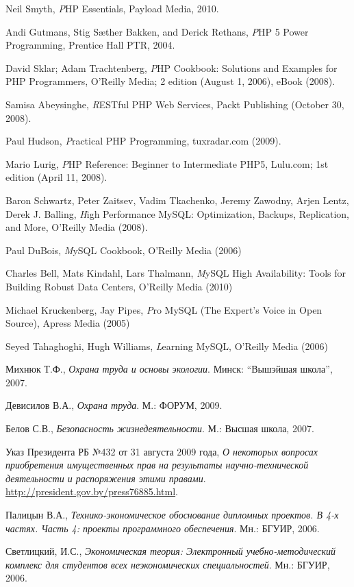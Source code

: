 \begin{thebibliography}{}

\bibitem{}
  Neil Smyth,
  \emph PHP Essentials,
  Payload Media,
  2010.

\bibitem{}
  Andi Gutmans, Stig Sæther Bakken, and Derick Rethans,
  \emph PHP 5 Power Programming,
  Prentice Hall PTR,
  2004.

\bibitem{}
  David Sklar; Adam Trachtenberg,
  \emph PHP Cookbook: Solutions and Examples for PHP Programmers,
  O'Reilly Media; 2 edition (August 1, 2006), eBook (2008).

\bibitem{}
  Samisa Abeysinghe,
  \emph RESTful PHP Web Services,
  Packt Publishing (October 30, 2008).

\bibitem{}
  Paul Hudson,
  \emph Practical PHP Programming,
  tuxradar.com (2009).

\bibitem{}
  Mario Lurig,
  \emph PHP Reference: Beginner to Intermediate PHP5,
  Lulu.com; 1st edition (April 11, 2008).

\bibitem{}
  Baron Schwartz, Peter Zaitsev, Vadim Tkachenko, Jeremy Zawodny, Arjen Lentz, Derek J. Balling,
  \emph High Performance MySQL: Optimization, Backups, Replication, and More,
  O'Reilly Media (2008).


\bibitem{}
  Paul DuBois,
  \emph MySQL Cookbook,
  O'Reilly Media (2006)

\bibitem{}
  Charles Bell, Mats Kindahl, Lars Thalmann,
  \emph MySQL High Availability: Tools for Building Robust Data Centers,
  O'Reilly Media (2010)

\bibitem{}
  Michael Kruckenberg, Jay Pipes,
  \emph Pro MySQL (The Expert's Voice in Open Source),
  Apress Media (2005)

\bibitem{}
  Seyed Tahaghoghi, Hugh Williams,
  \emph Learning MySQL,
  O'Reilly Media (2006)

  Михнюк Т.Ф.,
  \emph{Охрана труда и основы экологии}.
  Минск: ``Вышэйшая школа'',
  2007.

  Девисилов В.А.,
  \emph{Охрана труда}.
  М.: ФОРУМ,
  2009.

  Белов С.В.,
  \emph{Безопасность жизнедеятельности}.
  М.: Высшая школа,
  2007.

  Указ Президента РБ №432 от 31 августа 2009 года,
  \emph{О некоторых вопросах приобретения имущественных прав на результаты научно-технической деятельности и распоряжения этими правами}.
  \href{http://president.gov.by/press76885.html}{http://president.gov.by/press76885.html}.

  Палицын В.А.,
  \emph{Технико-экономическое обоснование дипломных проектов. В 4-х частях. Часть 4: проекты программного обеспечения}.
  Мн.: БГУИР,
  2006.

  Светлицкий, И.С.,
  \emph{Экономическая теория: Электронный учебно-методический комплекс для студентов всех неэкономических специальностей}.
  Мн.: БГУИР,
  2006.

\end{thebibliography}

